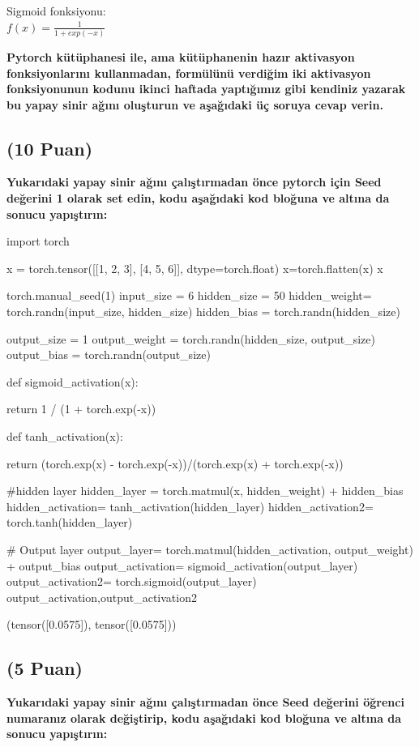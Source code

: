 \documentclass[11pt]{article}
\begin{document}
Sigmoid fonksiyonu:\\
$f(x) = \frac{1}{1 + exp(-x)}$

\vspace{.2in}
 \textbf{Pytorch kütüphanesi ile, ama kütüphanenin hazır aktivasyon fonksiyonlarını kullanmadan, formülünü verdiğim iki aktivasyon fonksiyonunun kodunu ikinci haftada yaptığımız gibi kendiniz yazarak bu yapay sinir ağını oluşturun ve aşağıdaki üç soruya cevap verin.}
 
\subsection{(10 Puan)} \textbf{Yukarıdaki yapay sinir ağını çalıştırmadan önce pytorch için Seed değerini 1 olarak set edin, kodu aşağıdaki kod bloğuna ve altına da sonucu yapıştırın:}

\begin{python}
import torch

x = torch.tensor([[1, 2, 3], [4, 5, 6]], dtype=torch.float)
x=torch.flatten(x)
x

torch.manual_seed(1)
input_size = 6
hidden_size = 50
hidden_weight= torch.randn(input_size, hidden_size)
hidden_bias = torch.randn(hidden_size)


output_size = 1
output_weight = torch.randn(hidden_size, output_size)
output_bias = torch.randn(output_size)

def sigmoid_activation(x):

  return 1 / (1 + torch.exp(-x))

  def tanh_activation(x):

    return (torch.exp(x) - torch.exp(-x))/(torch.exp(x) + torch.exp(-x))

#hidden layer
hidden_layer = torch.matmul(x, hidden_weight) + hidden_bias
hidden_activation= tanh_activation(hidden_layer)
hidden_activation2= torch.tanh(hidden_layer)

# Output layer
output_layer= torch.matmul(hidden_activation, output_weight) + output_bias
output_activation= sigmoid_activation(output_layer)
output_activation2= torch.sigmoid(output_layer)
output_activation,output_activation2
\end{python}

(tensor([0.0575]), tensor([0.0575]))

\subsection{(5 Puan)} \textbf{Yukarıdaki yapay sinir ağını çalıştırmadan önce Seed değerini öğrenci numaranız olarak değiştirip, kodu aşağıdaki kod bloğuna ve altına da sonucu yapıştırın:}
\end{document}
